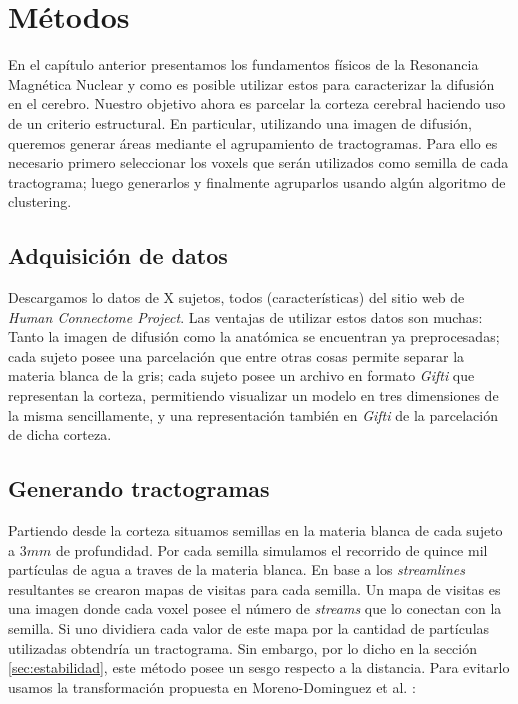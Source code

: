 \chapter{M\'etodos}

En el cap\'itulo anterior presentamos los fundamentos f\'isicos de la Resonancia
Magn\'etica Nuclear y como es posible utilizar estos para caracterizar la 
difusi\'on en el cerebro. Nuestro objetivo ahora es parcelar la corteza cerebral
haciendo uso de un criterio estructural. En particular, utilizando una imagen de
difusi\'on, queremos generar \'areas mediante el agrupamiento de tractogramas. 
Para ello es necesario primero seleccionar los voxels que ser\'an utilizados como
semilla de cada tractograma; luego generarlos y finalmente agruparlos usando 
alg\'un algoritmo de clustering.  \\


\section{Adquisici\'on de datos}

Descargamos lo datos de X sujetos, todos (caracter\'isticas) del sitio web 
de \textit{Human Connectome Project}. Las ventajas de utilizar estos datos son muchas:
Tanto la imagen de difusi\'on como la anat\'omica se encuentran ya preprocesadas;
cada sujeto posee una parcelaci\'on que entre otras cosas permite separar la materia
blanca de la gris; cada sujeto posee un archivo en formato \textit{Gifti} que
representan la corteza, permitiendo visualizar un modelo en tres dimensiones
de la misma sencillamente, y una representaci\'on tambi\'en en \textit{Gifti} 
de la parcelaci\'on de dicha corteza. \\







\section{Generando tractogramas}

Partiendo desde la corteza situamos semillas en la materia blanca de cada 
sujeto a $3mm$ de profundidad. Por cada semilla simulamos el recorrido de quince
mil part\'iculas de agua a traves de la materia blanca. En base a los \textit{streamlines}
resultantes se crearon mapas de visitas para cada semilla. Un mapa de visitas es
una imagen donde cada voxel posee el n\'umero de \textit{streams} que lo conectan
con la semilla. Si uno dividiera cada valor de este mapa por la cantidad de
part\'iculas utilizadas obtendr\'ia un tractograma. Sin embargo, por lo dicho en
la secci\'on \ref{sec:estabilidad}, este m\'etodo posee un sesgo respecto a la
distancia. Para evitarlo usamos la transformaci\'on propuesta en Moreno-Dominguez et
al. \cite{Moreno-Dominguez2014}:

